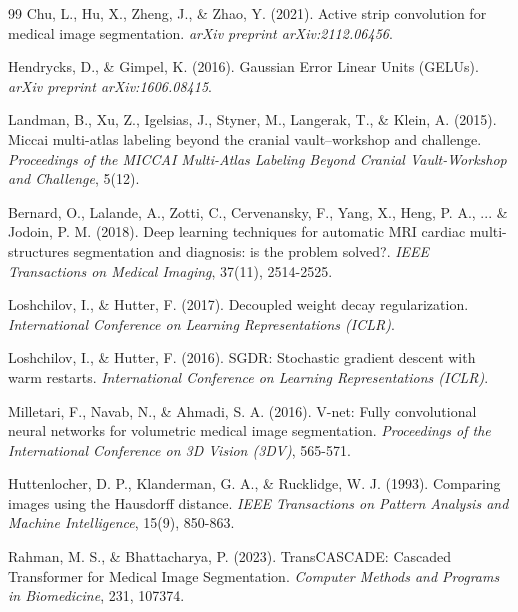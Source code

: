 \documentclass[10pt, a4paper, twocolumn]{article}
\begin{document}
\begin{thebibliography}{99}
Chu, L., Hu, X., Zheng, J., \& Zhao, Y. (2021). Active strip convolution for medical image segmentation. \textit{arXiv preprint arXiv:2112.06456}.

Hendrycks, D., \& Gimpel, K. (2016). Gaussian Error Linear Units (GELUs). \textit{arXiv preprint arXiv:1606.08415}.




Landman, B., Xu, Z., Igelsias, J., Styner, M., Langerak, T., \& Klein, A. (2015). Miccai multi-atlas labeling beyond the cranial vault--workshop and challenge. \textit{Proceedings of the MICCAI Multi-Atlas Labeling Beyond Cranial Vault-Workshop and Challenge}, 5(12).

Bernard, O., Lalande, A., Zotti, C., Cervenansky, F., Yang, X., Heng, P. A., ... \& Jodoin, P. M. (2018). Deep learning techniques for automatic MRI cardiac multi-structures segmentation and diagnosis: is the problem solved?. \textit{IEEE Transactions on Medical Imaging}, 37(11), 2514-2525.

Loshchilov, I., \& Hutter, F. (2017). Decoupled weight decay regularization. \textit{International Conference on Learning Representations (ICLR)}.

Loshchilov, I., \& Hutter, F. (2016). SGDR: Stochastic gradient descent with warm restarts. \textit{International Conference on Learning Representations (ICLR)}.

Milletari, F., Navab, N., \& Ahmadi, S. A. (2016). V-net: Fully convolutional neural networks for volumetric medical image segmentation. \textit{Proceedings of the International Conference on 3D Vision (3DV)}, 565-571.

Huttenlocher, D. P., Klanderman, G. A., \& Rucklidge, W. J. (1993). Comparing images using the Hausdorff distance. \textit{IEEE Transactions on Pattern Analysis and Machine Intelligence}, 15(9), 850-863.



Rahman, M. S., \& Bhattacharya, P. (2023). TransCASCADE: Cascaded Transformer for Medical Image Segmentation. \textit{Computer Methods and Programs in Biomedicine}, 231, 107374.


\end{thebibliography}
\end{document}
